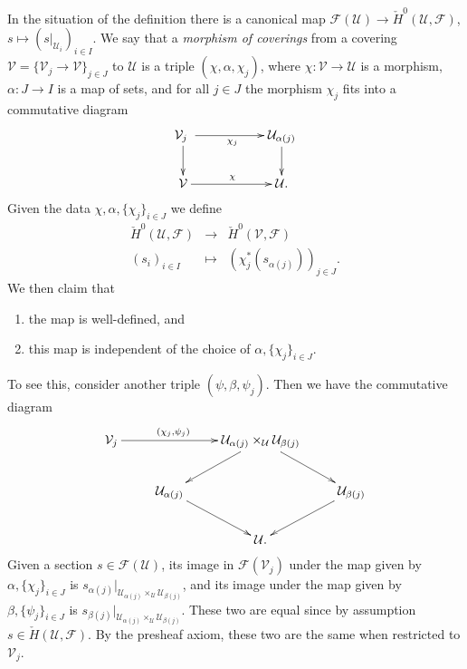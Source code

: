 \noindent
In the situation of the definition there is a canonical map
$\mathcal{F}(\mathcal{U}) \to \check H^0 (\mathcal{U}, \mathcal{F})$,
$s \mapsto (s |_{\mathcal{U}_i})_{i\in I}$.
We say that a {\it morphism of coverings} from a covering
$\mathcal{V} = \{ \mathcal{V}_j \to \mathcal{V}\}_{j \in J}$
to $\mathcal{U}$ is a triple $(\chi, \alpha, \chi_j)$, where
$\chi : \mathcal{V} \to \mathcal{U}$ is a morphism,
$\alpha : J \to I$ is a map of sets, and for all
$j \in J$ the morphism $\chi_j$ fits into a commutative diagram
$$
\xymatrix{
{\mathcal{V}_j\ } \ar[rr]_{\chi_j} \ar[d] & &
{\mathcal{U}_{\alpha(j)}} \ar[d]
\\
\mathcal{V} \ar[rr]^\chi & &
{\mathcal{U}.}
}
$$
Given the data $\chi, \alpha, \{\chi_j\}_{i\in J}$ we define
\begin{eqnarray*}
\check H^0 (\mathcal{U}, \mathcal{F}) & \to &
\check H^0 (\mathcal{V}, \mathcal{F}) \\
(s_i)_{i\in I} & \mapsto & \left(\chi_j^*\left(s
_{\alpha(j)}\right)\right)_{j\in J}.
\end{eqnarray*}
We then claim that
\begin{enumerate}
\item the map is well-defined, and
\item this map is independent of the choice of $\alpha, \{\chi_j\}_{i\in J}$.
\end{enumerate}
To see this, consider another triple $(\psi, \beta, \psi_j)$.
Then we have the commutative diagram
$$
\xymatrix{
{\mathcal{V}_j} \ar^{(\chi_j, \psi_j)\qquad}[rr] & &
{\mathcal{U}_{\alpha(j)}\times_\mathcal{U} \mathcal{U}_{\beta(j)}} \ar[dl]
\ar[dr] \\
& {\mathcal{U}_{\alpha(j)}} \ar[dr] && {\mathcal{U}_{\beta(j)}} \ar[dl] \\
& &{\mathcal{U}.}
}
$$
Given a section $s \in \mathcal{F}(\mathcal{U})$, its image in
$\mathcal{F}(\mathcal{V}_j)$ under the map given by $\alpha, \{\chi_j\}_{i\in
J}$ is $s_{\alpha(j)} | _{{\mathcal{U}_{\alpha(j)}\times_\mathcal{U}
\mathcal{U}_{\beta(j)}}}$, and its image under the map given by $\beta,
\{\psi_j\}_{i\in J}$ is $s_{\beta(j)} |
_{{\mathcal{U}_{\alpha(j)}\times_\mathcal{U} \mathcal{U}_{\beta(j)}}}$. These
two are equal since by assumption $s \in \check H(\mathcal{U}, \mathcal{F})$.
By the presheaf axiom, these two are the same when restricted to
$\mathcal{V}_j$.

